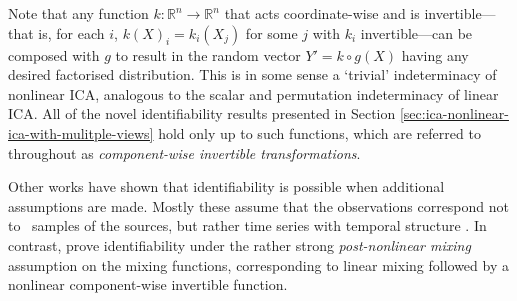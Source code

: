 %
%

Note that any function ${k}: \mathbb{R}^n \to \mathbb{R}^n$ that acts coordinate-wise and is invertible---that is, for each $i$, ${k}(X)_i = k_i(X_j)$ for some $j$ with $k_i$ invertible---can be composed with ${g}$ to result in the random vector $Y'={k}\circ {g}(X)$ having any desired factorised distribution. 
This is in some sense a `trivial' indeterminacy of nonlinear ICA, analogous to the scalar and permutation indeterminacy of linear ICA.
All of the novel identifiability results presented in Section \ref{sec:ica-nonlinear-ica-with-mulitple-views} hold only up to such functions, which are referred to throughout as \emph{component-wise invertible transformations}.


Other works have shown that identifiability is possible when additional assumptions are made.
Mostly these assume that the observations correspond not to \iid~samples of the sources, but rather time series with temporal structure \citep{singer2008non, sprekeler2014extension}.
In contrast, \cite{taleb1999source} prove identifiability under the rather strong \emph{post-nonlinear mixing} assumption on the mixing functions, corresponding to linear mixing followed by a nonlinear component-wise invertible function.


